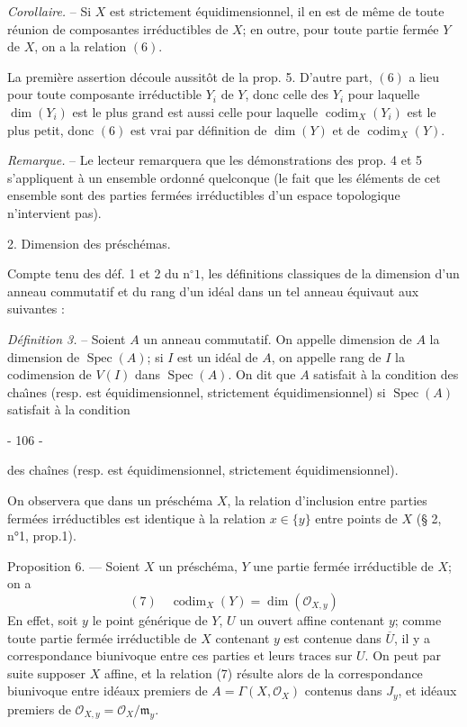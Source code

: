 \emph{Corollaire.} -- Si $X$ est strictement \'equidimensionnel, il en est de m\^eme de toute r\'eunion de composantes irr\'eductibles de $X$; en outre, pour toute partie ferm\'ee $Y$ de $X$, on a la relation $(6)$.

La premi\`ere assertion d\'ecoule aussit\^ot de la prop. 5. D'autre part, $(6)$ a lieu pour toute composante irr\'eductible $Y_i$ de $Y$, donc celle des $Y_i$ pour laquelle $\dim(Y_i)$ est le plus grand est aussi celle pour laquelle $\operatorname{codim}_X(Y_i)$ est le plus petit, donc $(6)$ est vrai par d\'efinition de $\dim(Y)$ et de $\operatorname{codim}_X(Y)$.

\emph{Remarque.} -- Le lecteur remarquera que les d\'emonstrations des prop. 4 et 5 s'appliquent \`a un ensemble ordonn\'e quelconque (le fait que les \'el\'ements de cet ensemble sont des parties ferm\'ees irr\'eductibles d'un espace topologique n'intervient pas).

2. Dimension des pr\'esch\'emas.

Compte tenu des d\'ef. 1 et 2 du n$^\circ 1$, les d\'efinitions classiques de la dimension d'un anneau commutatif et du rang d'un id\'eal dans un tel anneau \'equivaut aux suivantes :

\emph{D\'efinition 3.} -- Soient $A$ un anneau commutatif. On appelle dimension de $A$ la dimension de $\operatorname{Spec}(A)$; si $I$ est un id\'eal de $A$, on appelle rang de $I$ la codimension de $V(I)$ dans $\operatorname{Spec}(A)$. On dit que $A$ satisfait \`a la condition des cha\^\i nes (resp. est \'equidimensionnel, strictement \'equidimensionnel) si $\operatorname{Spec}(A)$ satisfait \`a la condition 

\newpage


- 106 -

des chaînes (resp. est équidimensionnel, strictement équidimensionnel).

On observera que dans un préschéma $X$, la relation d'inclusion entre parties fermées irréductibles est identique à la relation $x \in \{y\}$ entre points de $X$ (§ 2, n°1, prop.1).

Proposition 6. — Soient $X$ un préschéma, $Y$ une partie fermée irréductible de $X$; on a
$$(7) \quad \operatorname{codim}_X(Y) = \dim(\mathcal{O}_{X,y})$$
En effet, soit $y$ le point générique de $Y$, $U$ un ouvert affine contenant $y$; comme toute partie fermée irréductible de $X$ contenant $y$ est contenue dans $\overline{U}$, il y a correspondance biunivoque entre ces parties et leurs traces sur $U$. On peut par suite supposer $X$ affine, et la relation (7) résulte alors de la correspondance biunivoque entre idéaux premiers de $A = \Gamma(X, \mathcal{O}_X)$ contenus dans $J_y$, et idéaux premiers de $\mathcal{O}_{X,y} = \mathcal{O}_X / \mathfrak{m}_y$.

